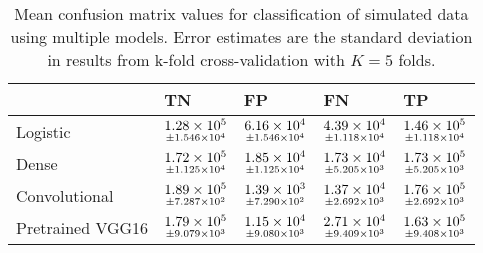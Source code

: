 \begin{table}
\centering
\caption{
Mean confusion matrix values for classification of simulated data using multiple models. 
Error estimates are the standard deviation in results from k-fold cross-validation with $K=5$ folds.
}
\label{tab:classification-simulated-confmat}
\begin{tabular}{lllll}
\toprule
{} &                                                     TN &                                                     FP &                                                     FN &                                                     TP \\
\midrule
Logistic         &  $\underset{\num{+- 1.546e+04 }  }{\num{ 1.28e+05 } }$ &  $\underset{\num{+- 1.546e+04 }  }{\num{ 6.16e+04 } }$ &  $\underset{\num{+- 1.118e+04 }  }{\num{ 4.39e+04 } }$ &  $\underset{\num{+- 1.118e+04 }  }{\num{ 1.46e+05 } }$ \\
Dense            &  $\underset{\num{+- 1.125e+04 }  }{\num{ 1.72e+05 } }$ &  $\underset{\num{+- 1.125e+04 }  }{\num{ 1.85e+04 } }$ &  $\underset{\num{+- 5.205e+03 }  }{\num{ 1.73e+04 } }$ &  $\underset{\num{+- 5.205e+03 }  }{\num{ 1.73e+05 } }$ \\
Convolutional    &  $\underset{\num{+- 7.287e+02 }  }{\num{ 1.89e+05 } }$ &  $\underset{\num{+- 7.290e+02 }  }{\num{ 1.39e+03 } }$ &  $\underset{\num{+- 2.692e+03 }  }{\num{ 1.37e+04 } }$ &  $\underset{\num{+- 2.692e+03 }  }{\num{ 1.76e+05 } }$ \\
Pretrained VGG16 &  $\underset{\num{+- 9.079e+03 }  }{\num{ 1.79e+05 } }$ &  $\underset{\num{+- 9.080e+03 }  }{\num{ 1.15e+04 } }$ &  $\underset{\num{+- 9.409e+03 }  }{\num{ 2.71e+04 } }$ &  $\underset{\num{+- 9.408e+03 }  }{\num{ 1.63e+05 } }$ \\
\bottomrule
\end{tabular}
\end{table}
